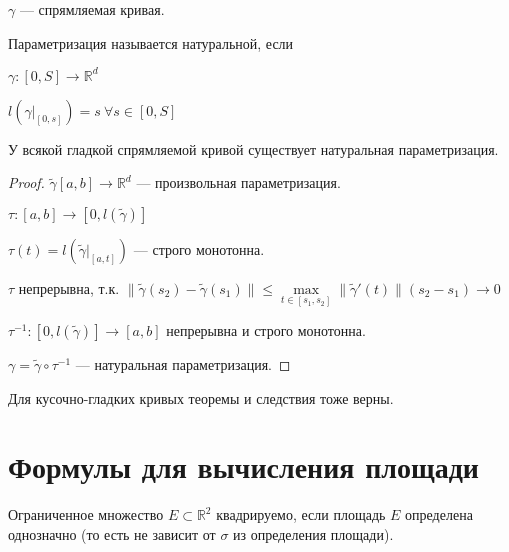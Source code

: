     \begin{Def}

        $\gamma$ --- спрямляемая кривая.

        Параметризация называется натуральной, если 
    
        $\gamma \colon [0, S] \rightarrow \mathbb{R}^d$

        $l(\gamma|_{[0, s]}) = s \: \forall s \in [0, S]$

    \end{Def}

    \begin{theorem}

        У всякой гладкой спрямляемой кривой существует натуральная параметризация.

    \end{theorem}

    \begin{proof}

        $\widetilde{\gamma}[a, b] \rightarrow \mathbb{R}^d$ --- произвольная параметризация.

        $\tau \colon [a, b] \rightarrow [0, l(\widetilde{\gamma})]$

        $\tau(t) = l(\widetilde{\gamma}|_{[a, t]})$ --- строго монотонна.

        $\tau$ непрерывна, т.к. $\|\widetilde{\gamma}(s_2) - \widetilde{\gamma}(s_1)\| \le \max\limits_{t \in [s_1,s_2]}\|\widetilde{\gamma}'(t)\|(s_2 - s_1) \rightarrow 0$

        $\tau^{-1} \colon [0, l(\widetilde{\gamma})] \rightarrow [a, b]$ непрерывна и строго монотонна.

        $\gamma = \widetilde{\gamma} \circ \tau^{-1}$ --- натуральная параметризация.

    \end{proof}

    \begin{Rem}

        Для кусочно-гладких кривых теоремы и следствия тоже верны.

    \end{Rem}

\section {Формулы для вычисления площади}

    \begin{Def}

        Ограниченное множество $E \subset \mathbb{R}^2$ квадрируемо, если площадь $E$ определена однозначно (то есть не зависит от $\sigma$ из определения площади).

    \end{Def}

